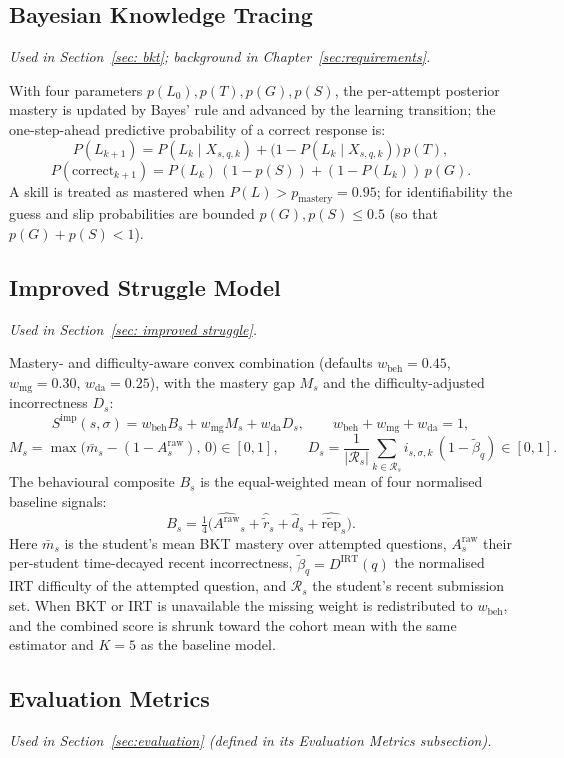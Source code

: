 \subsection{Bayesian Knowledge Tracing}
\emph{Used in Section~\ref{sec: bkt}; background in Chapter~\ref{sec:requirements}.}

With four parameters $p(L_0),p(T),p(G),p(S)$, the per-attempt posterior mastery is updated by Bayes' rule and advanced by the learning transition; the one-step-ahead predictive probability of a correct response is:
\[
    P(L_{k+1}) = P(L_k \mid X_{s,q,k}) + \big(1 - P(L_k \mid X_{s,q,k})\big)\,p(T),
\]
\[
    P(\text{correct}_{k+1}) = P(L_k)\,(1-p(S)) + (1-P(L_k))\,p(G).
\]
A skill is treated as mastered when $P(L) > p_{\mathrm{mastery}} = 0.95$; for identifiability the guess and slip probabilities are bounded $p(G),p(S) \le 0.5$ (so that $p(G)+p(S)<1$).

\subsection{Improved Struggle Model}
\emph{Used in Section~\ref{sec: improved struggle}.}

Mastery- and difficulty-aware convex combination (defaults $w_{\mathrm{beh}}=0.45$, $w_{\mathrm{mg}}=0.30$, $w_{\mathrm{da}}=0.25$), with the mastery gap $M_s$ and the difficulty-adjusted incorrectness $D_s$:
\[
    S^{\mathrm{imp}}(s,\sigma)
    = w_{\mathrm{beh}} B_s + w_{\mathrm{mg}} M_s + w_{\mathrm{da}} D_s,
    \qquad
    w_{\mathrm{beh}} + w_{\mathrm{mg}} + w_{\mathrm{da}} = 1,
\]
\[
    M_s = \max\!\big(\bar{m}_s - (1 - A^{\mathrm{raw}}_s),\, 0\big) \in [0,1],
    \qquad
    D_s = \frac{1}{|\mathcal{R}_s|} \sum_{k \in \mathcal{R}_s} i_{s,\sigma,k}\,(1 - \tilde{\beta}_q) \in [0,1].
\]
The behavioural composite $B_s$ is the equal-weighted mean of four normalised baseline signals:
\[
    B_s = \tfrac{1}{4}\big(\widehat{A^{\mathrm{raw}}}_s + \hat{\tilde{r}}_s + \hat{d}_s + \widehat{\tilde{\mathrm{rep}}}_s\big).
\]
Here $\bar{m}_s$ is the student's mean BKT mastery over attempted questions, $A^{\mathrm{raw}}_s$ their per-student time-decayed recent incorrectness, $\tilde{\beta}_q = D^{\mathrm{IRT}}(q)$ the normalised IRT difficulty of the attempted question, and $\mathcal{R}_s$ the student's recent submission set. When BKT or IRT is unavailable the missing weight is redistributed to $w_{\mathrm{beh}}$, and the combined score is shrunk toward the cohort mean with the same estimator and $K=5$ as the baseline model.

\subsection{Evaluation Metrics}
\emph{Used in Section~\ref{sec:evaluation} (defined in its Evaluation Metrics subsection).}

